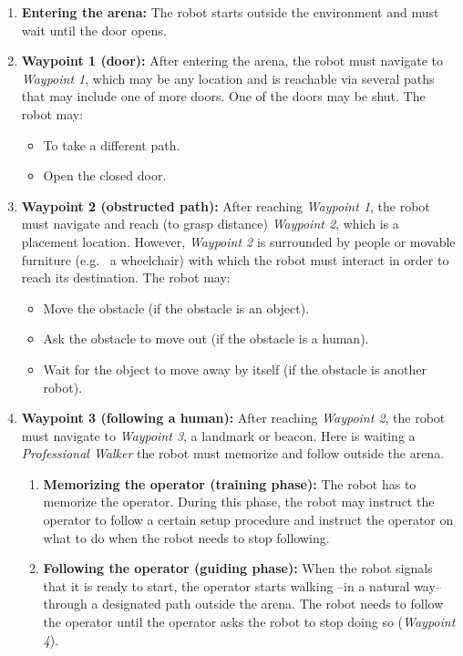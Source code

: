 \begin{enumerate}
	\item \textbf{Entering the arena:} The robot starts outside the environment and must wait until the door opens.

	\item \textbf{Waypoint 1 (door):} After entering the arena, the robot must navigate to \textit{Waypoint 1}, which may be any location and is reachable via several paths that may include one of more doors. One of the doors may be shut. The robot may:
	\begin{itemize}
		\item To take a different path.
		\item Open the closed door.
	\end{itemize}

	\item \textbf{Waypoint 2 (obstructed path):} After reaching \textit{Waypoint 1}, the robot must navigate and reach (to grasp distance) \textit{Waypoint 2}, which is a placement location. However, \textit{Waypoint 2} is surrounded by people or movable furniture (e.g.~ a wheelchair) with which the robot must interact in order to reach its destination. The robot may:
	\begin{itemize}
		\item Move the obstacle (if the obstacle is an object).
		\item Ask the obstacle to move out (if the obstacle is a human).
		\item Wait for the object to move away by itself (if the obstacle is another robot).
	\end{itemize}

	\item \textbf{Waypoint 3 (following a human):} After reaching \textit{Waypoint 2}, the robot must navigate to \textit{Waypoint 3}, a landmark or beacon. Here is waiting a \textit{Professional Walker} the robot must memorize and follow outside the arena.

	\begin{enumerate}
	\item \textbf{Memorizing the operator (training phase):} The robot has to memorize the operator. During this phase, the robot may instruct the operator to follow a certain setup procedure and instruct the operator on what to do when the robot needs to stop following.
	\item \textbf{Following the operator (guiding phase):} When the robot signals that it is ready to start, the operator starts walking --in a natural way-- through a designated path outside the arena. The robot needs to follow the operator until the operator asks the robot to stop doing so (\textit{Waypoint 4}).
	\end{enumerate}


\end{enumerate}
